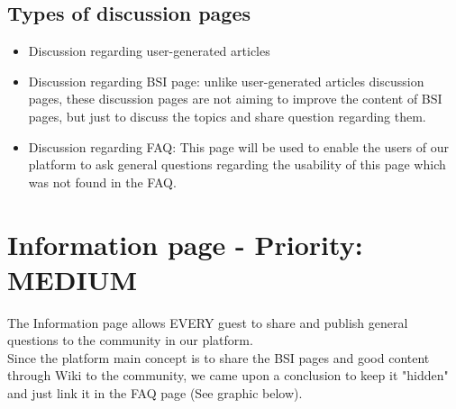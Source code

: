 \subsection{Types of discussion pages}
\begin{itemize}
\item Discussion regarding user-generated articles
\item Discussion regarding BSI page: unlike user-generated articles discussion pages, these discussion pages are not aiming to improve the content of BSI pages, but just to discuss the topics and share question regarding them.
\item Discussion regarding FAQ: This page will be used to enable the users of our platform to ask general questions regarding the usability of this page which was not found in the FAQ.
 
 \end{itemize}
 
\section{Information page - Priority: MEDIUM}
 The Information page allows EVERY guest to share and publish general questions to the community in our platform.\\
 Since the platform main concept is to share the BSI pages and good content through Wiki to the community, we came upon a conclusion to keep it "hidden" and just link it in the FAQ page (See graphic below). \\
 
